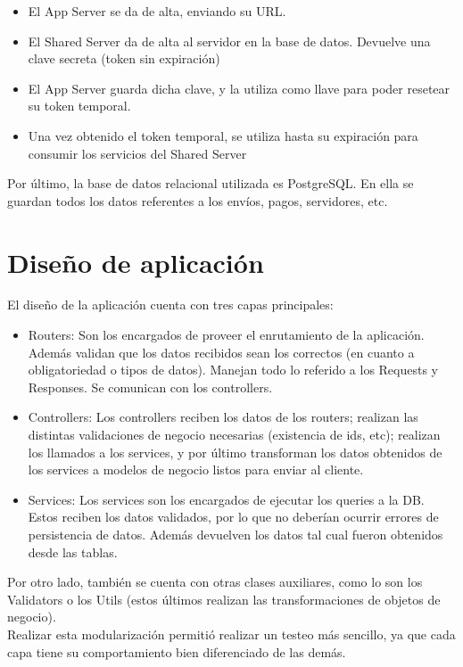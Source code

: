 \documentclass[a4paper, 12pt]{article}
\begin{document}
	\begin{itemize}
	\item El App Server se da de alta, enviando su URL.
	\item El Shared Server da de alta al servidor en la base de datos. Devuelve una clave secreta (token sin expiración)
	\item El App Server guarda dicha clave, y la utiliza como llave para poder resetear su token temporal.
	\item Una vez obtenido el token temporal, se utiliza hasta su expiración para consumir los servicios del Shared Server
	\end{itemize}
	
	Por último, la base de datos relacional utilizada es PostgreSQL. En ella se guardan todos los datos referentes a los envíos, pagos, servidores, etc.

	\section{Diseño de aplicación}
	El diseño de la aplicación cuenta con tres capas principales:
	
	\begin{itemize}
	\item Routers: Son los encargados de proveer el enrutamiento de la aplicación. Además validan que los datos recibidos sean los correctos (en cuanto a obligatoriedad o tipos de datos). Manejan todo lo referido a los Requests y Responses. Se comunican con los controllers.
	\item Controllers: Los controllers reciben los datos de los routers; realizan las distintas validaciones de negocio necesarias (existencia de ids, etc); realizan los llamados a los services, y por último transforman los datos obtenidos de los services a modelos de negocio listos para enviar al cliente.
	\item Services: Los services son los encargados de ejecutar los queries a la DB. Estos reciben los datos validados, por lo que no deberían ocurrir errores de persistencia de datos. Además devuelven los datos tal cual fueron obtenidos desde las tablas.
	\end{itemize}
	
	Por otro lado, también se cuenta con otras clases auxiliares, como lo son los Validators o los Utils (estos últimos realizan las transformaciones de objetos de negocio).\\
	
	Realizar esta modularización permitió realizar un testeo más sencillo, ya que cada capa tiene su comportamiento bien diferenciado de las demás.
	
\end{document}

